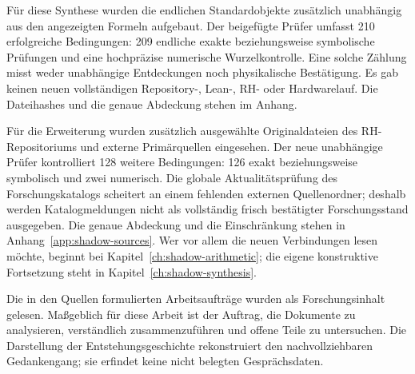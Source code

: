\documentclass[11pt,a4paper,oneside,parskip=half,headings=normal]{scrreprt}
\begin{document}
Für diese Synthese wurden die endlichen Standardobjekte zusätzlich unabhängig aus den angezeigten Formeln aufgebaut. Der beigefügte Prüfer umfasst 210 erfolgreiche Bedingungen: 209 endliche exakte beziehungsweise symbolische Prüfungen und eine hochpräzise numerische Wurzelkontrolle. Eine solche Zählung misst weder unabhängige Entdeckungen noch physikalische Bestätigung. Es gab keinen neuen vollständigen Repository-, Lean-, RH- oder Hardwarelauf. Die Dateihashes und die genaue Abdeckung stehen im Anhang.

Für die Erweiterung wurden zusätzlich ausgewählte Originaldateien des RH-Repositoriums und externe Primärquellen eingesehen. Der neue unabhängige Prüfer kontrolliert 128 weitere Bedingungen: 126 exakt beziehungsweise symbolisch und zwei numerisch. Die globale Aktualitätsprüfung des Forschungskatalogs scheitert an einem fehlenden externen Quellenordner; deshalb werden Katalogmeldungen nicht als vollständig frisch bestätigter Forschungsstand ausgegeben. Die genaue Abdeckung und die Einschränkung stehen in Anhang~\ref{app:shadow-sources}. Wer vor allem die neuen Verbindungen lesen möchte, beginnt bei Kapitel~\ref{ch:shadow-arithmetic}; die eigene konstruktive Fortsetzung steht in Kapitel~\ref{ch:shadow-synthesis}.

Die in den Quellen formulierten Arbeitsaufträge wurden als Forschungsinhalt gelesen. Maßgeblich für diese Arbeit ist der Auftrag, die Dokumente zu analysieren, verständlich zusammenzuführen und offene Teile zu untersuchen. Die Darstellung der Entstehungsgeschichte rekonstruiert den nachvollziehbaren Gedankengang; sie erfindet keine nicht belegten Gesprächsdaten.

\endgroup
\tableofcontents
\clearpage
{}



























\appendix




\end{document}
